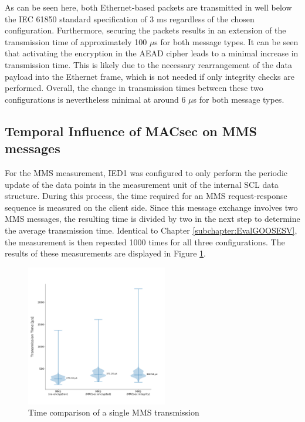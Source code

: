 \documentclass[conference, onecolumn, a4paper]{IEEEtran}
\begin{document}
\noindent As can be seen here, both Ethernet-based packets are transmitted in well below the IEC 61850 standard specification of 3 ms 
\cite{fixedLatencyGOOSESV:2021} regardless of the chosen configuration. Furthermore, securing the packets results in an extension of the transmission 
time of approximately 100 $\mu$s for both message types. It can be seen that activating the encryption in the AEAD cipher leads to a minimal 
increase in transmission time. This is likely due to the necessary rearrangement of the data payload into the Ethernet frame, which is not needed 
if only integrity checks are performed. Overall, the change in transmission times between these two configurations is nevertheless minimal at around 
6 $\mu$s for both message types. 

\subsection{Temporal Influence of MACsec on MMS messages}
\label{subchapter:EvalMMS}
\noindent For the MMS measurement, IED1 was configured to only perform the periodic update of the data points in the measurement unit of the internal 
SCL data structure. During this process, the time required for an MMS request-response sequence is measured on the client side. Since this message 
exchange involves two MMS messages, the resulting time is divided by two in the next step to determine the average transmission time. Identical to 
Chapter \ref{subchapter:EvalGOOSESV}, the measurement is then repeated 1000 times for all three configurations. The results of these measurements are 
displayed in Figure \ref{image:MMSTimings}. 

\begin{figure}[h]
    \centering
    \includegraphics[width=0.55\textwidth]{images/MMS_group_all_configs.png}
    \caption{Time comparison of a single MMS transmission}
    \label{image:MMSTimings}
\end{figure}
\end{document}
